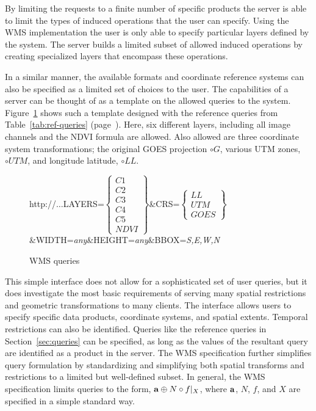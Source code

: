 \documentclass{ucdthesis}       %
\begin{document}
By limiting the requests to a finite number of specific products the
server is able to limit the types of induced operations that the user
can specify.  Using the \ac{WMS} implementation the user is only able
to specify particular layers defined by the system.  The server builds
a limited subset of allowed induced operations by creating specialized
layers that encompass these operations.

In a similar manner, the available formats and coordinate reference
systems can also be specified as a limited set of choices to the user.
The capabilities of a server can be thought of as a template on the
allowed queries to the system.  Figure~\ref{fig:wms-queries} shows
such a template designed with the reference queries from
Table~\ref{tab:ref-queries} (page~\pageref{tab:ref-queries}).  Here,
six different layers, including all image channels and the \ac{NDVI}
formula are allowed.  Also allowed are three coordinate system
transformations; the original \ac{GOES} projection $\circ G$, various
\ac{UTM} zones, $\circ UTM$, and longitude latitude, $\circ LL$.

\begin{figure}[htb]
  \centering
  http://$\ldots$LAYERS=$\left\{\begin{array}{c}C1\\C2\\C3\\C4\\C5\\NDVI\end{array}\right\}$\&CRS=$\left\{\begin{array}{c}LL\\UTM\\GOES\end{array}\right\}$\\
  \vspace*{6pt}
  \&WIDTH=\emph{any}\&HEIGHT=\emph{any}\&BBOX=\emph{S,E,W,N}
  \caption{\ac{WMS} queries}
  \label{fig:wms-queries}
\end{figure}


This simple interface does not allow for a sophisticated set of user
queries, but it does investigate the most basic requirements of
serving many spatial restrictions and geometric transformations to
many clients.  The interface allows users to specify specific data
products, coordinate systems, and spatial extents.  Temporal
restrictions can also be identified.  Queries like the reference
queries in Section~\ref{sec:queries} can be specified, as long as the
values of the resultant query are identified as a product in the
server.  The \ac{WMS} specification further simplifies query
formulation by standardizing and simplifying both spatial transforms
and restrictions to a limited but well-defined subset.  In general,
the \ac{WMS} specification limits queries to the form, ${\bf{a}}
\oplus N \circ f |_{X}$, where ${\bf{a}}$, $N$, $f$, and $X$ are
specified in a simple standard way.
\end{document}
